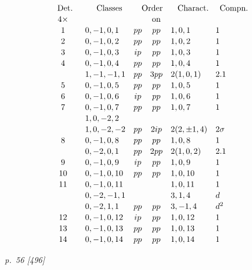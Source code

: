 ﻿\documentclass[11pt,a4paper]{article}
\theoremstyle{plain}
\theoremstyle{definition}
\begin{document}
\[
\renewcommand{\arraystretch}{1.12}
\begin{array}{c@{\quad}r@{\quad}l@{\quad}c@{\quad}c@{\quad}l@{\quad}l}
\multicolumn{1}{c}{\text{Det.}}&&
\multicolumn{1}{c}{\text{Classes}}&
\multicolumn{2}{c}{\text{Order}}&
\multicolumn{1}{c}{\text{Charact.}}&
\multicolumn{1}{c}{\text{Compn.}}\\
4\times&&& &\text{on}&&\\
1&&0,-1,0,1&pp&pp&1,0,1&1\\
2&&0,-1,0,2&pp&pp&1,0,2&1\\
3&&0,-1,0,3&ip&pp&1,0,3&1\\
4&&0,-1,0,4&pp&pp&1,0,4&1\\
&&1,-1,-1,1&pp&3pp&2(1,0,1)&2.1\\
5&&0,-1,0,5&pp&pp&1,0,5&1\\
6&&0,-1,0,6&ip&pp&1,0,6&1\\
7&&0,-1,0,7&pp&pp&1,0,7&1\\
&&1,0,-2,2&&&&\\
&&1,0,-2,-2&pp&2ip&2(2,\pm1,4)&2\sigma\\
8&&0,-1,0,8&pp&pp&1,0,8&1\\
&&0,-2,0,1&pp&2pp&2(1,0,2)&2.1\\
9&&0,-1,0,9&ip&pp&1,0,9&1\\
10&&0,-1,0,10&pp&pp&1,0,10&1\\
11&&0,-1,0,11&&&1,0,11&1\\
&&0,-2,-1,1&&&3,1,4&d\\
&&0,-2,1,1&pp&pp&3,-1,4&d^2\\
12&&0,-1,0,12&ip&pp&1,0,12&1\\
13&&0,-1,0,13&pp&pp&1,0,13&1\\
14&&0,-1,0,14&pp&pp&1,0,14&1
\end{array}
\]

\clearpage
\textit{p.~56 [496]}
\end{document}
